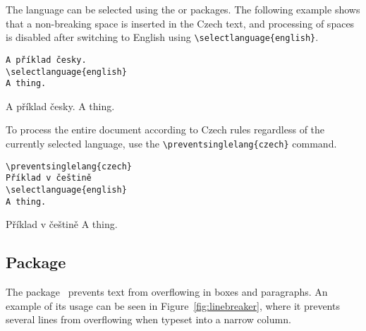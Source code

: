 \documentclass{ltugboat}
\begin{document}
The language can be selected using the  or 
packages. The following example shows that a non-breaking space is inserted in
the Czech text, and processing of spaces is disabled after switching to English
using \verb|\selectlanguage{english}|.

\begin{verbatim}
A příklad česky.
\selectlanguage{english}
A thing.
\end{verbatim}

\preventsingledebugon

\noindent 
A příklad česky.
A thing.

\preventsingledebugoff



\bigskip

To process the entire document according to Czech rules regardless of the
currently selected language, use the \verb|\preventsinglelang{czech}| command.

\begin{verbatim}
\preventsinglelang{czech}
Příklad v češtině
\selectlanguage{english}
A thing.
\end{verbatim}

\preventsingledebugon

\noindent Příklad v češtině
A thing.

\preventsingledebugoff

\subsection{ Package}

\newcommand\testbox[1]{%
  \parbox{120pt}{%
    \parindent=15pt%
    \tolerance=1%
    \pretolerance=1%
    #1
  }%
}

\newcommand\printtest[1]{%
  \linebreakerdisable%
  \begin{subfigure}[b]{.45\textwidth}
    \centering
  \noindent\testbox{%
    #1
  }%
  \caption{Without the \tbcode{Linebreaker} package}
  \end{subfigure}
  \linebreakerenable%
  \hfill%
  \begin{subfigure}[b]{.45\textwidth}
    \centering
  \testbox{%
    #1
  }%
  \medskip
  \caption{With the \tbcode{Linebreaker} package}
  \end{subfigure}
}

The  package~\cite{linebreaker} prevents text from
overflowing in boxes and paragraphs. An example of its usage can be seen in
Figure~\ref{fig:linebreaker}, where it prevents several lines from overflowing
when typeset into a narrow column.
\end{document}
